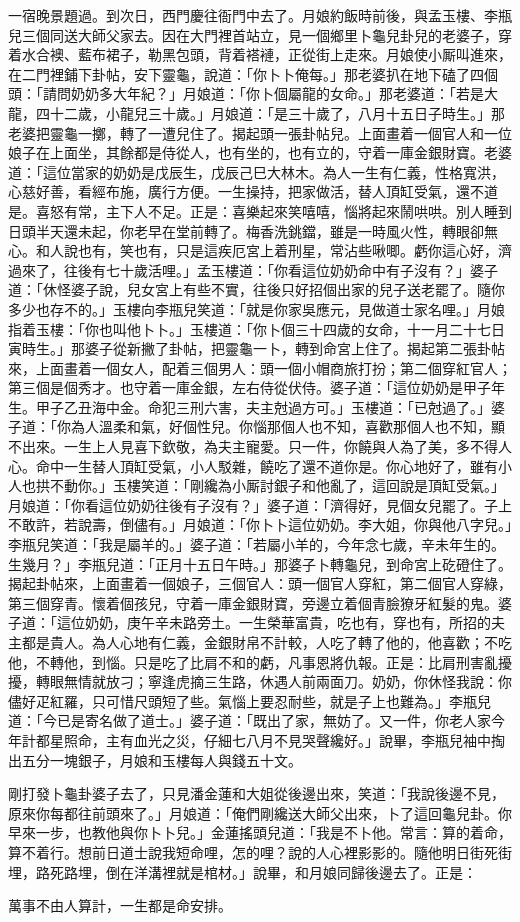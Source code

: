 一宿晚景題過。到次日，西門慶往衙門中去了。月娘約飯時前後，與孟玉樓、李瓶兒三個同送大師父家去。因在大門裡首站立，見一個鄉里卜龜兒卦兒的老婆子，穿着水合襖、藍布裙子，勒黑包頭，背着褡褳，正從街上走來。月娘使小厮叫進來，在二門裡鋪下卦帖，安下靈龜，說道：「你卜卜俺每。」那老婆扒在地下磕了四個頭：「請問奶奶多大年紀？」月娘道：「你卜個屬龍的女命。」那老婆道：「若是大龍，四十二歲，小龍兒三十歲。」月娘道：「是三十歲了，八月十五日子時生。」那老婆把靈龜一擲，轉了一遭兒住了。揭起頭一張卦帖兒。上面畫着一個官人和一位娘子在上面坐，其餘都是侍從人，也有坐的，也有立的，守着一庫金銀財寶。老婆道：「這位當家的奶奶是戊辰生，戊辰己巳大林木。為人一生有仁義，性格寬洪，心慈好善，看經布施，廣行方便。一生操持，把家做活，替人頂缸受氣，還不道是。喜怒有常，主下人不足。正是：喜樂起來笑嘻嘻，惱將起來鬧哄哄。別人睡到日頭半天還未起，你老早在堂前轉了。梅香洗銚鐺，雖是一時風火性，轉眼卻無心。和人說也有，笑也有，只是這疾厄宮上着刑星，常沾些啾唧。虧你這心好，濟過來了，往後有七十歲活哩。」孟玉樓道：「你看這位奶奶命中有子沒有？」婆子道：「休怪婆子說，兒女宮上有些不實，往後只好招個出家的兒子送老罷了。隨你多少也存不的。」玉樓向李瓶兒笑道：「就是你家吳應元，見做道士家名哩。」月娘指着玉樓：「你也叫他卜卜。」玉樓道：「你卜個三十四歲的女命，十一月二十七日寅時生。」那婆子從新撇了卦帖，把靈龜一卜，轉到命宮上住了。揭起第二張卦帖來，上面畫着一個女人，配着三個男人：頭一個小帽商旅打扮；第二個穿紅官人；第三個是個秀才。也守着一庫金銀，左右侍從伏侍。婆子道：「這位奶奶是甲子年生。甲子乙丑海中金。命犯三刑六害，夫主尅過方可。」玉樓道：「已尅過了。」婆子道：「你為人溫柔和氣，好個性兒。你惱那個人也不知，喜歡那個人也不知，顯不出來。一生上人見喜下欽敬，為夫主寵愛。只一件，你饒與人為了美，多不得人心。命中一生替人頂缸受氣，小人駁雜，饒吃了還不道你是。你心地好了，雖有小人也拱不動你。」玉樓笑道：「剛纔為小厮討銀子和他亂了，這回說是頂缸受氣。」月娘道：「你看這位奶奶往後有子沒有？」婆子道：「濟得好，見個女兒罷了。子上不敢許，若說壽，倒儘有。」月娘道：「你卜卜這位奶奶。李大姐，你與他八字兒。」李瓶兒笑道：「我是屬羊的。」婆子道：「若屬小羊的，今年念七歲，辛未年生的。生幾月？」李瓶兒道：「正月十五日午時。」那婆子卜轉龜兒，到命宮上矻磴住了。揭起卦帖來，上面畫着一個娘子，三個官人：頭一個官人穿紅，第二個官人穿綠，第三個穿青。懷着個孩兒，守着一庫金銀財寶，旁邊立着個青臉獠牙紅髮的鬼。{}婆子道：「這位奶奶，庚午辛未路旁土。一生榮華富貴，吃也有，穿也有，所招的夫主都是貴人。為人心地有仁義，金銀財帛不計較，人吃了轉了他的，他喜歡；不吃他，不轉他，到惱。只是吃了比肩不和的虧，凡事恩將仇報。正是：比肩刑害亂擾擾，轉眼無情就放刁；寧逢虎摘三生路，休遇人前兩面刀。奶奶，你休怪我說：你儘好疋紅羅，只可惜尺頭短了些。氣惱上要忍耐些，就是子上也難為。」李瓶兒道：「今已是寄名做了道士。」婆子道：「既出了家，無妨了。又一件，你老人家今年計都星照命，主有血光之災，仔細七八月不見哭聲纔好。」說畢，李瓶兒袖中掏出五分一塊銀子，月娘和玉樓每人與錢五十文。

剛打發卜龜卦婆子去了，只見潘金蓮和大姐從後邊出來，笑道：「我說後邊不見，原來你每都往前頭來了。」月娘道：「俺們剛纔送大師父出來，卜了這回龜兒卦。你早來一步，也教他與你卜卜兒。」金蓮搖頭兒道：「我是不卜他。常言：算的着命，算不着行。想前日道士說我短命哩，怎的哩？說的人心裡影影的。隨他明日街死街埋，路死路埋，倒在洋溝裡就是棺材。」說畢，和月娘同歸後邊去了。正是：

\begin{myquote}
萬事不由人算計，一生都是命安排。
\end{myquote}

